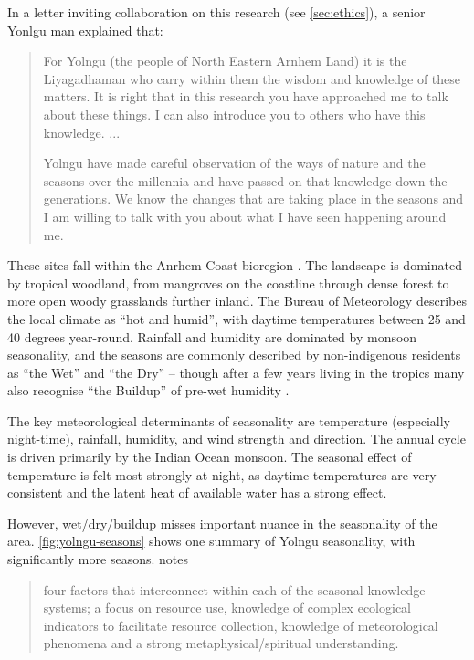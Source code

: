 In a letter inviting collaboration on this research (see \autoref{sec:ethics}),
a senior Yonlgu man explained that:

\blockquote{
    For Yolngu (the people of North Eastern Arnhem Land) it is the Liyagadhaman
    who carry within them the wisdom and knowledge of these matters.
    It is right that in this research you have approached me to talk about these
    things. I can also introduce you to others who have this knowledge.  ...

    Yolngu have made careful observation of the ways of nature and the seasons
    over the millennia and have passed on that knowledge down the generations.
    We know the changes that are taking place in the seasons and I am willing
    to talk with you about what I have seen happening around me.
}



These sites fall within the Anrhem Coast bioregion \citep{ens2014}.
The landscape is dominated by tropical woodland, from mangroves on the coastline
through dense forest to more open woody grasslands further inland.
%
The Bureau of Meteorology describes the local
climate as ``hot and humid'', with daytime temperatures between 25 and 40
degrees year-round.  Rainfall and humidity are dominated by monsoon
seasonality, and the seasons are commonly described by non-indigenous residents
as “the Wet” and “the Dry” – though after a few years living in the tropics
many also recognise “the Buildup” of pre-wet humidity \citep{willmett2009}.

The key meteorological determinants of seasonality are temperature (especially
night-time), rainfall, humidity, and wind strength and direction.  The annual
cycle is driven primarily by the Indian Ocean monsoon.  The seasonal effect of
temperature is felt most strongly at night, as daytime temperatures are very
consistent and the latent heat of available water has a strong effect.

However, wet/dry/buildup misses important nuance in the seasonality of the
area.  \autoref{fig:yolngu-seasons} shows one summary of Yolngu seasonality,
with significantly more seasons.  \citet{woodward2012b} notes
\blockquote{
    four factors that interconnect within each of the seasonal
    knowledge systems; a focus on resource use, knowledge of complex
    ecological indicators to facilitate resource collection,
    knowledge of meteorological phenomena and a strong
    metaphysical/spiritual understanding.
}



